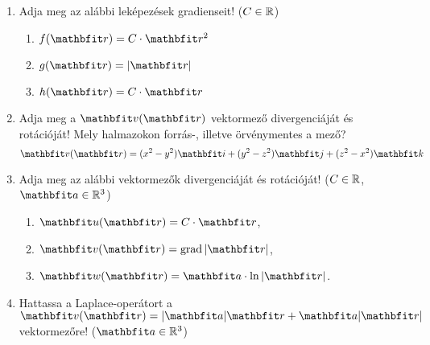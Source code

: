 \documentclass{szb-practice}
\begin{document}
\begin{enumerate}
  \item Adja meg az alábbi leképezések gradienseit!
        ($C \in \mathbb{R}$)
        \begin{enumerate}
          \item $f (\coordvec) = C \cdot \coordvec^2$
          \item $g (\coordvec) = |\coordvec|$
          \item $h (\coordvec) = C \cdot \coordvec$
        \end{enumerate}

  \item Adja meg a $\rvec v (\coordvec)$ vektormező divergenciáját és rotációját!
        Mely halmazokon forrás-, illetve örvénymentes a mező?
        $$
          \rvec v(\coordvec)
          = (x^2 - y^2) \rvec i
          + (y^2 - z^2) \rvec j
          + (z^2 - x^2) \rvec k
        $$

  \item Adja meg az alábbi vektormezők divergenciáját és rotációját!
        ($C \in \mathbb{R}$, $\rvec a \in \Reals^3$)
        \begin{enumerate}
          \item $\rvec u(\coordvec) = C \cdot \coordvec$,
          \item $\rvec v(\coordvec) = \grad |\coordvec|$,
          \item $\rvec w(\coordvec) = \rvec a \cdot \ln |\coordvec|$.
        \end{enumerate}

  \item Hattassa a Laplace-operátort a $\rvec v (\coordvec) = |\rvec a| \coordvec +
          \rvec a |\coordvec|$ vektormezőre! ($\rvec a \in \Reals^3$)
\end{enumerate}
\end{document}

